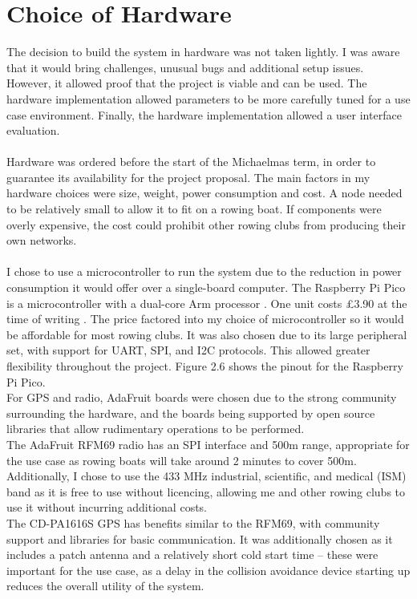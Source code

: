 \documentclass[12pt,a4paper]{report}
\begin{document}
\section{Choice of Hardware}
The decision to build the system in hardware was not taken lightly. I was aware that it would bring challenges, unusual bugs and additional setup issues. However, it allowed proof that the project is viable and can be used. The hardware implementation allowed parameters to be more carefully tuned for a use case environment. Finally, the hardware implementation allowed a user interface evaluation.\\ \\
Hardware was ordered before the start of the Michaelmas term, in order to guarantee its availability for the project proposal. The main factors in my hardware choices were size, weight, power consumption and cost. A node needed to be relatively small to allow it to fit on a rowing boat. If components were overly expensive, the cost could prohibit other rowing clubs from producing their own networks. \\ \\
I chose to use a microcontroller to run the system due to the reduction in power consumption it would offer over a single-board computer. The Raspberry Pi Pico is a microcontroller with a dual-core Arm processor \cite{rp2040}. One unit costs £3.90 at the time of writing \cite{buypico}. The price factored into my choice of microcontroller so it would be affordable for most rowing clubs. It was also chosen due to its large peripheral set, with support for UART, SPI, and I2C protocols. This allowed greater flexibility throughout the project. Figure 2.6 shows the pinout for the Raspberry Pi Pico. \\
For GPS and radio, AdaFruit boards were chosen due to the strong community surrounding the hardware, and the boards being supported by open source libraries that allow rudimentary operations to be performed. \\
The AdaFruit RFM69 radio has an SPI interface and 500m range, appropriate for the use case as rowing boats will take around 2 minutes to cover 500m. Additionally, I chose to use the 433 MHz industrial, scientific, and medical (ISM) band as it is free to use without licencing, allowing me and other rowing clubs to use it without incurring additional costs. \\
The CD-PA1616S GPS has benefits similar to the RFM69, with community support and libraries for basic communication. It was additionally chosen as it includes a patch antenna and a relatively short cold start time -- these were important for the use case, as a delay in the collision avoidance device starting up reduces the overall utility of the system.
\end{document}
